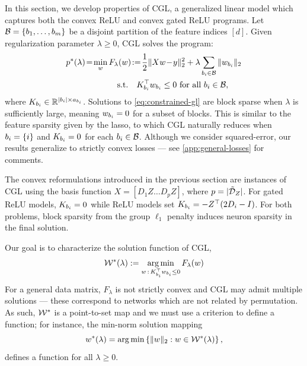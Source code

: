 
In this section, we develop properties of CGL,
a generalized linear model which captures both the convex ReLU and convex gated
ReLU programs.
Let \( \mathcal{B} = \left\{b_1, \ldots, b_m\right\} \) be a disjoint partition of the
feature indices \( [d] \).
Given regularization parameter \( \lambda \geq 0 \),
CGL solves the program:
\begin{equation}\label{eq:constrained-gl}
    \begin{aligned}
        p^*(\lambda) \!=\! \min_{w} \,
         & F_\lambda(w) \!:=\! \frac 1 2 \|X w \!-\! y\|_2^2 + \lambda \sum_{{b_i} \in \mathcal{B}} \|w_{b_i}\|_2 \\
         & \quad \text{s.t.} \quad K_{{b_i}}^\top w_{b_i} \leq 0  \text{ for all } {b_i} \in \mathcal{B},
    \end{aligned}
\end{equation}
where \( K_{{b_i}} \in \mathbb{R}^{|{b_i}| \times a_{b_i}} \).
Solutions to \cref{eq:constrained-gl} are block sparse when \( \lambda \)
is sufficiently large, meaning \( w_{b_i} = 0 \) for a subset of blocks.
This is similar to the feature sparsity given by the lasso,
to which CGL naturally reduces when \( {b_i} = \left\{i\right\} \)
and \( K_{{b_i}} = 0 \) for each \( {b_i} \in \mathcal{B} \).
Although we consider squared-error, our results generalize to
strictly convex losses --- see \cref{app:general-losses} for comments.

The convex reformulations introduced in the previous section are instances
of CGL using the basis function \( X = [D_1 Z \ldots D_p Z] \),
where \( p = |\tilde {\mathcal{D}}_Z| \).
For gated ReLU models, \( K_{{b_i}} = 0 \) while ReLU models set
\( K_{{b_i}} = - Z^\top (2 D_i - I) \).
For both problems, block sparsity from the group \( \ell_1 \) penalty
induces neuron sparsity in the final solution.

Our goal is to characterize the solution function of CGL,
\[
    \mathcal{W}^*(\lambda) := \mathop{\rm arg\,min}_{w \, : \, K_{b_i}^\top w_{b_i} \leq 0} F_\lambda(w)
\]
For a general data matrix, \( F_\lambda \) is not strictly convex and
CGL may admit multiple solutions --- these correspond to networks which
are not related by permutation.
As such, \( \mathcal{W}^* \) is a point-to-set map and
we must use a criterion to define a function;
for instance, the min-norm solution mapping
\[
    w^*(\lambda) = \mathop{\rm arg\,min} \left\{ \|w\|_2 : w \in \mathcal{W}^*(\lambda) \right\},
\]
defines a function for all \( \lambda \geq 0 \).

